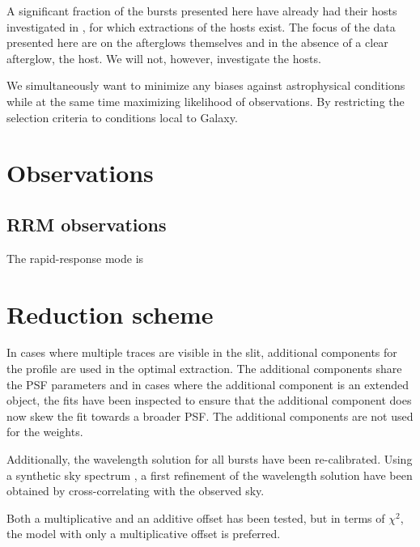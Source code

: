 \documentclass[iop, twocolappendix, numberedappendix, tighten, appendixfloats]{emulateapj}
\begin{document}
	A significant fraction of the bursts presented here  have already had their hosts investigated in \citet{Kruhler2015}, for which extractions of the hosts exist. The focus of the data presented here are on the afterglows themselves and in the absence of a clear afterglow, the host. We will not, however, investigate the hosts. 


	We simultaneously want to minimize any biases against astrophysical conditions while at the same time maximizing likelihood of observations. By restricting the selection criteria to conditions local to Galaxy.

	\cleardoublepage

	
	\section{Observations}
	

	
	\subsection{RRM observations} \label{RRM}
	The rapid-response mode is 
	
	\section{Reduction scheme}


	In cases where multiple traces are visible in the slit, additional components
	for the profile are used in the optimal extraction. The additional components
	share the PSF parameters and in cases where the additional component is an
	extended object, the fits have been inspected to ensure that the additional
	component does now skew the fit towards a broader PSF. The additional
	components are not used for the weights.

	Additionally, the wavelength solution for all bursts have been re-calibrated. Using a synthetic sky spectrum \citep{Noll2012, Jones2013}, a first refinement of the wavelength solution have been obtained by cross-correlating with the observed sky. 
	
	
	Both a multiplicative and an additive offset has been tested, but in terms of $\chi^2$, the model with only a multiplicative offset is preferred. 
	
\end{document}
